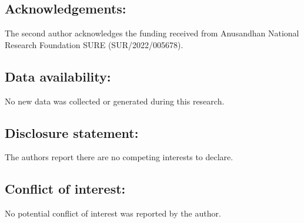 \documentclass[12pt,a4paper,reqno]{amsproc}
\theoremstyle{definition}
\theoremstyle{remark}
\numberwithin{equation}{section}
\begin{document}
\subsection*{Acknowledgements:} The second author acknowledges the funding received from Anusandhan National Research Foundation SURE (SUR/2022/005678).
\subsection*{Data availability:} No new data was collected or generated during this research.
\subsection*{Disclosure statement:} The authors report there are no competing interests to declare.  

\subsection*{Conflict of interest:} No potential conflict of interest was reported by the author.
\end{document}
